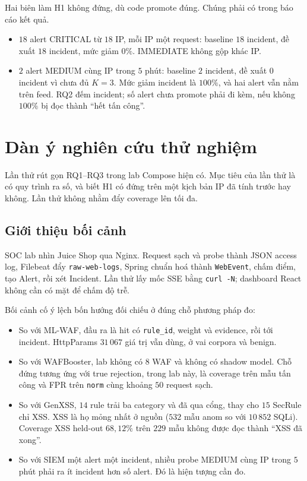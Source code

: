 \documentclass[a4paper,11pt]{article}
\begin{document}
Hai biên làm H1 không đứng, dù code promote đúng. Chúng phải có trong báo cáo kết quả.

\begin{itemize}
\item $18$ alert CRITICAL từ $18$ IP, mỗi IP một request: baseline $18$ incident, đề xuất $18$ incident, mức giảm $0\%$. IMMEDIATE không gộp khác IP.
\item $2$ alert MEDIUM cùng IP trong $5$ phút: baseline $2$ incident, đề xuất $0$ incident vì chưa đủ $K{=}3$. Mức giảm incident là $100\%$, và hai alert vẫn nằm trên feed. RQ2 đếm incident; số alert chưa promote phải đi kèm, nếu không $100\%$ bị đọc thành ``hết tấn công''.
\end{itemize}

\section{Dàn ý nghiên cứu thử nghiệm}
\label{sec:pilot}

Lần thử rút gọn RQ1--RQ3 trong lab Compose hiện có. Mục tiêu của lần thử là có quy trình ra số, và biết H1 có đứng trên một kịch bản IP đã tính trước hay không. Lần thử không nhằm đẩy coverage lên tối đa.

\subsection{Giới thiệu bối cảnh}

SOC lab nhìn Juice Shop qua Nginx. Request sạch và probe thành JSON access log, Filebeat đẩy \texttt{raw-web-logs}, Spring chuẩn hoá thành \texttt{WebEvent}, chấm điểm, tạo Alert, rồi xét Incident. Lần thử lấy mốc SSE bằng \texttt{curl -N}; dashboard React không cần có mặt để chấm độ trễ.

Bối cảnh cố ý lệch bốn hướng đối chiếu ở đúng chỗ phương pháp đo:

\begin{itemize}
\item So với ML-WAF, đầu ra là hit có \texttt{rule\_id}, weight và evidence, rồi tới incident. HttpParams $31\,067$ giá trị vẫn dùng, ở vai corpora và benign.
\item So với WAFBooster, lab không có $8$ WAF và không có shadow model. Chỗ đứng tương ứng với true rejection, trong lab này, là coverage trên mẫu tấn công và FPR trên \texttt{norm} cùng khoảng $50$ request sạch.
\item So với GenXSS, $14$ rule trải ba category và đã qua cổng, thay cho $15$ SecRule chỉ XSS. XSS là họ mỏng nhất ở nguồn ($532$ mẫu anom so với $10\,852$ SQLi). Coverage XSS held-out $68{,}12\%$ trên $229$ mẫu không được đọc thành ``XSS đã xong''.
\item So với SIEM một alert một incident, nhiều probe MEDIUM cùng IP trong $5$ phút phải ra ít incident hơn số alert. Đó là hiện tượng cần đo.
\end{itemize}
\end{document}
